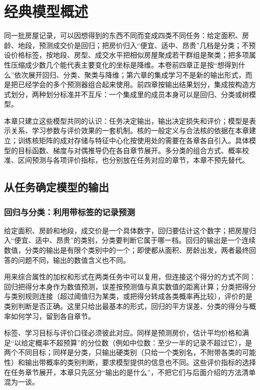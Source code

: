 \chapter{经典模型概述}
\label{chap:classic-models-overview}

同一批房屋记录，可以因想得到的东西不同而变成四类不同任务：给定面积、房龄、地段，预测成交价是回归；把房价归入“便宜、适中、昂贵”几档是分类；不预设价格标签，按地段、房型、成交水平把相似房屋聚成若干群组是聚类；把多项属性压缩成少数几个能代表主要变化的坐标是降维。本卷前四章正是按“想得到什么”依次展开回归、分类、聚类与降维；第六章的集成学习不是新的输出形式，而是把已经学会的多个预测器组合起来使用。前四章按输出结果划分，集成按构造方式划分，两种划分标准并不互斥：一个集成里的成员本身可以是回归、分类或树模型。

本章只建立这些模型共同的认识：任务决定输出，输出决定损失和评价；模型是表示关系、学习参数与评价效果的一套机制。核的一般定义与合法核的依据在本章建立；训练核矩阵的成对存储与特征中心化按使用处的需要在各章各自引入。具体模型的目标函数、梯度与对偶推导仍在各自章节展开。多分类的组合方式、概率校准、区间预测与各项评价指标，也分别放在任务对应的章节，本章不预先替代。

\section{从任务确定模型的输出}
\label{sec:classic-tasks}

\subsection{回归与分类：利用带标签的记录预测}
给定面积、房龄和地段，成交价是一个具体数字，回归要估计这个数字；把房屋归入“便宜、适中、昂贵”的类别，分类要判断它属于哪一档。回归的输出是一个连续数值，分类的输出是有限个类别中的一个；即使都从面积、房龄出发，两者最终回答的问题不同，输出的数值含义也不同。

用来综合属性的加权和形式在两类任务中可以复用，但连接这个得分的方式不同：回归把得分本身作为数值预测，误差按预测值与真实数值的距离计算；分类把得分与类别规则连接（超过阈值归为某类，或把得分转成各类概率再比较），评价的是类别判断是否正确。这里只给出最基本的形式，回归的平方误差、分类的得分与概率如何学习，留到各自章节。

标签、学习目标与评价口径必须彼此对应。同样是预测房价，估计平均价格和满足“以给定概率不超预算”的分位数（例如中位数：至少一半的记录不超过它），是两个不同目标；同样是分类，只输出硬类别（只给一个类别名，不附带各类的可能性）和输出带概率的类别判断，要求模型提供的信息也不同。这些评价指标的选择在任务章节展开，本章只先区分“输出的是什么”，不把它们与后面介绍的方法清单混为一谈。

